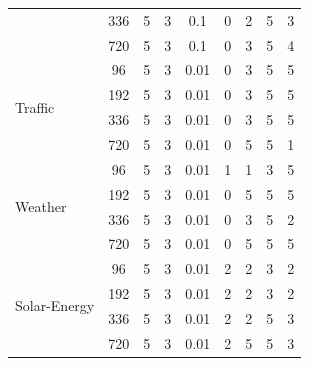 \begin{table}[!t]
{\begin{tabular}{l|c|c|c|c|c|c|c|c}
     & 336 & 5 & 3 & 0.1 & 0 & 2 & 5 & 3 \\
     & 720 & 5 & 3 & 0.1 & 0 & 3 & 5 & 4 \\
    \midrule
    \multirow{4}{*}{Traffic} & 96 & 5 & 3 & 0.01 & 0 & 3 & 5 & 5 \\
     & 192 & 5 & 3 & 0.01 & 0 & 3 & 5 & 5 \\
     & 336 & 5 & 3 & 0.01 & 0 & 3 & 5 & 5 \\
     & 720 & 5 & 3 & 0.01 & 0 & 5 & 5 & 1 \\
    \midrule
    \multirow{4}{*}{Weather} & 96 & 5 & 3 & 0.01 & 1 & 1 & 3 & 5 \\
     & 192 & 5 & 3 & 0.01 & 0 & 5 & 5 & 5 \\
     & 336 & 5 & 3 & 0.01 & 0 & 3 & 5 & 2 \\
     & 720 & 5 & 3 & 0.01 & 0 & 5 & 5 & 5 \\
    \midrule
    \multirow{4}{*}{Solar-Energy} & 96 & 5 & 3 & 0.01 & 2 & 2 & 3 & 2 \\
     & 192 & 5 & 3 & 0.01 & 2 & 2 & 3 & 2 \\
     & 336 & 5 & 3 & 0.01 & 2 & 2 & 5 & 3 \\
     & 720 & 5 & 3 & 0.01 & 2 & 5 & 5 & 3 \\
    \bottomrule
    \end{tabular}
    }
\end{table}
